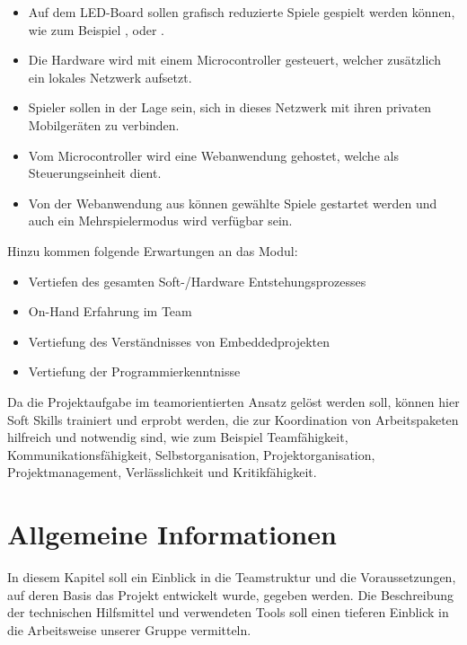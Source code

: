 \documentclass[12pt,a4paper]{article}
\begin{document}
\begin{itemize}
\item Auf dem LED-Board sollen grafisch reduzierte Spiele gespielt werden können, wie zum Beispiel  \grqq,\grqq{} oder \grqq.
\item Die Hardware wird mit einem Microcontroller gesteuert, welcher zusätzlich ein lokales Netzwerk aufsetzt.
\item Spieler sollen in der Lage sein, sich in dieses Netzwerk mit ihren privaten Mobilgeräten zu verbinden.
\item Vom Microcontroller wird eine Webanwendung gehostet, welche als Steuerungseinheit dient.
\item Von der Webanwendung aus können gewählte Spiele gestartet werden und auch ein Mehrspielermodus wird verfügbar sein.
\end{itemize}
     
Hinzu kommen folgende Erwartungen an das Modul: 
\begin{itemize}
\item Vertiefen des gesamten Soft-/Hardware Entstehungsprozesses
\item On-Hand Erfahrung im Team 
\item Vertiefung des Verständnisses von Embeddedprojekten
\item Vertiefung der Programmierkenntnisse
\end{itemize}

Da die Projektaufgabe im teamorientierten Ansatz gelöst werden soll, können hier Soft Skills trainiert und erprobt werden, die zur Koordination von Arbeitspaketen hilfreich und notwendig sind, wie zum Beispiel Teamfähigkeit, Kommunikationsfähigkeit, Selbstorganisation, Projektorganisation, Projektmanagement, Verlässlichkeit und Kritikfähigkeit.



\section{Allgemeine Informationen}
In diesem Kapitel soll ein Einblick in die Teamstruktur und die Voraussetzungen, auf deren Basis das Projekt entwickelt wurde, gegeben werden. Die Beschreibung der technischen Hilfsmittel und verwendeten Tools soll einen tieferen Einblick in die Arbeitsweise unserer Gruppe vermitteln.
\end{document}
